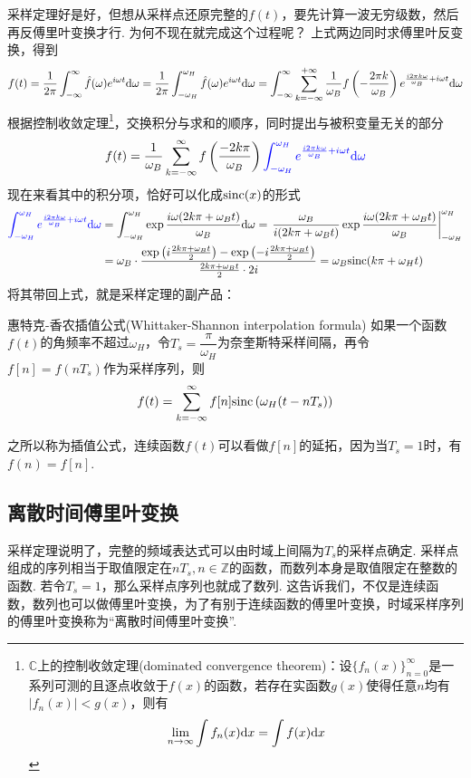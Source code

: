 \documentclass[main.tex]{subfiles}
\begin{document}
采样定理好是好，但想从采样点还原完整的\(f(t)\)，要先计算一波无穷级数，然后再反傅里叶变换才行. 为何不现在就完成这个过程呢？
上式两边同时求傅里叶反变换，得到
\[f(t) = \frac{1}{2\pi}\int_{-\infty}^{\infty}\hat{f}(\omega)e^{i\omega t}{\rm d}\omega 
= \frac{1}{2\pi}\int_{-\omega_H}^{\omega_H}\hat{f}(\omega)e^{i\omega t}{\rm d}\omega 
= \int_{-\infty}^{\infty}\sum_{k=-\infty}^{+\infty} \frac{1}{\omega_B}f\left(-\frac{2\pi k}{\omega_B}\right)e^{\frac{i2\pi k\omega}{\omega_B} + i\omega t}{\rm d}\omega\]
根据控制收敛定理\footnote{\(\mathbb{C}\)上的控制收敛定理(dominated convergence theorem)：设\(\{f_n(x)\}_{n=0}^{\infty}\)是一系列可测的且逐点收敛于\(f(x)\)的函数，若存在实函数\(g(x)\)使得任意\(n\)均有\(|f_n(x)|<g(x)\)，则有\[\lim_{n \to \infty}\int f_n(x){\rm d}x = \int f(x){\rm d}x\]}，交换积分与求和的顺序，同时提出与被积变量无关的部分
\[f(t) = \frac{1}{\omega_B}\sum_{k=-\infty}^{\infty}f\left(\frac{-2k\pi}{\omega_B}\right){\color{blue}\int_{-\omega_H}^{\omega_H}e^{\frac{i2\pi k\omega}{\omega_B} + i\omega t}{\rm d}\omega}\]
现在来看其中的积分项，恰好可以化成\({\rm sinc}(x)\)的形式
\begin{align*}
    {\color{blue}\int_{-\omega_H}^{\omega_H}e^{\frac{i2\pi k\omega}{\omega_B} + i\omega t}{\rm d}\omega} 
    &= \int_{-\omega_H}^{\omega_H}\exp{\frac{i\omega(2k\pi+\omega_Bt)}{\omega_B}}{\rm d}\omega
    = \left.\frac{\omega_B}{i(2k\pi+\omega_Bt)}\exp{\frac{i\omega(2k\pi+\omega_Bt)}{\omega_B}}\right|_{-\omega_H}^{\omega_H} \\
    &= \omega_B\cdot\frac{\exp\left(i\frac{2k\pi+\omega_Bt}{2}\right) - \exp\left(-i\frac{2k\pi+\omega_Bt}{2}\right)}{\frac{2k\pi+\omega_Bt}{2}\cdot 2i} = \omega_B{\rm sinc}(k\pi+\omega_Ht)
\end{align*}
将其带回上式，就是采样定理的副产品：
\begin{theorem}{惠特克-香农插值公式(Whittaker-Shannon interpolation formula)}
    如果一个函数\(f(t)\)的角频率不超过\(\omega_H\)，令\(T_s=\dfrac{\pi}{\omega_H}\)为奈奎斯特采样间隔，再令\(f[n]=f(nT_s)\)作为采样序列，则
    \[f(t) = \sum_{k=-\infty}^{\infty}f[n]{\rm sinc}\left(\omega_H(t-nT_s)\right)\]
\end{theorem}
之所以称为插值公式，连续函数\(f(t)\)可以看做\(f[n]\)的延拓，因为当\(T_s=1\)时，有\(f(n)=f[n]\).

\subsection{离散时间傅里叶变换}

采样定理说明了，完整的频域表达式可以由时域上间隔为\(T_s\)的采样点确定. 采样点组成的序列相当于取值限定在\(nT_s, n\in \mathbb{Z}\)的函数，而数列本身是取值限定在整数的函数. 若令\(T_s=1\)，那么采样点序列也就成了数列. 这告诉我们，不仅是连续函数，数列也可以做傅里叶变换，为了有别于连续函数的傅里叶变换，时域采样序列的傅里叶变换称为“离散时间傅里叶变换”.
\end{document}
